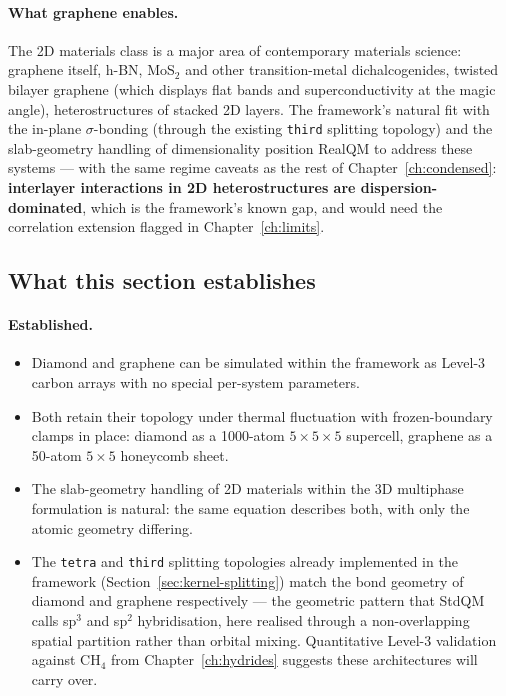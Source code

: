 \paragraph{What graphene enables.}
The 2D materials class is a major area of contemporary materials science: graphene itself, h-BN, MoS$_2$ and other transition-metal dichalcogenides, twisted bilayer graphene (which displays flat bands and superconductivity at the magic angle), heterostructures of stacked 2D layers. The framework's natural fit with the in-plane $\sigma$-bonding (through the existing \texttt{third} splitting topology) and the slab-geometry handling of dimensionality position RealQM to address these systems --- with the same regime caveats as the rest of Chapter~\ref{ch:condensed}: \textbf{interlayer interactions in 2D heterostructures are dispersion-dominated}, which is the framework's known gap, and would need the correlation extension flagged in Chapter~\ref{ch:limits}.

\subsection{What this section establishes}

\paragraph{Established.}
\begin{itemize}
\item Diamond and graphene can be simulated within the framework as Level-3 carbon arrays with no special per-system parameters.
\item Both retain their topology under thermal fluctuation with frozen-boundary clamps in place: diamond as a 1000-atom $5 \times 5 \times 5$ supercell, graphene as a 50-atom $5 \times 5$ honeycomb sheet.
\item The slab-geometry handling of 2D materials within the 3D multiphase formulation is natural: the same equation describes both, with only the atomic geometry differing.
\item The \texttt{tetra} and \texttt{third} splitting topologies already implemented in the framework (Section~\ref{sec:kernel-splitting}) match the bond geometry of diamond and graphene respectively --- the geometric pattern that StdQM calls sp$^3$ and sp$^2$ hybridisation, here realised through a non-overlapping spatial partition rather than orbital mixing. Quantitative Level-3 validation against CH$_4$ from Chapter~\ref{ch:hydrides} suggests these architectures will carry over.
\end{itemize}

